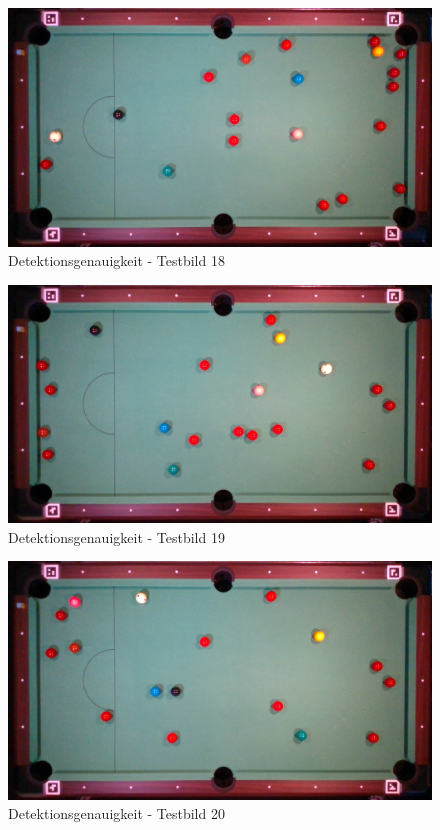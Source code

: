 \begin{figure}[h!]
    \begin{center}
        \includegraphics[width=0.8\linewidth]{../common/07_appendix/resources/00_detection/17_detektion_testbild_18.png}
    \end{center}
    \caption{Detektionsgenauigkeit - Testbild 18}
    \label{fig:detektionsgenauigkeit:testbild:18}
\end{figure}
\begin{figure}[h!]
    \begin{center}
        \includegraphics[width=0.8\linewidth]{../common/07_appendix/resources/00_detection/18_detektion_testbild_19.png}
    \end{center}
    \caption{Detektionsgenauigkeit - Testbild 19}
    \label{fig:detektionsgenauigkeit:testbild:19}
\end{figure}
\begin{figure}[h!]
    \begin{center}
        \includegraphics[width=0.8\linewidth]{../common/07_appendix/resources/00_detection/19_detektion_testbild_20.png}
    \end{center}
    \caption{Detektionsgenauigkeit - Testbild 20}
    \label{fig:detektionsgenauigkeit:testbild:20}
\end{figure}


